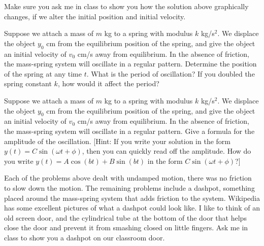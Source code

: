 Make sure you ask me in class to show you how the solution above graphically changes, if we alter the initial position and initial velocity.

\begin{problem}
 Suppose we attach a mass of $m$ kg to a spring with modulus $k$ kg/s$^2$. We displace the object $y_0$ cm from the equilibrium position of the spring, and give the object an initial velocity of $v_0$ cm/s away from equilibrium. In the absence of friction, the mass-spring system will oscillate in a regular pattern. Determine the position of the spring at any time $t$.  What is the period of oscillation? If you doubled the spring constant $k$, how would it affect the period?
\end{problem}

\begin{problem}
 Suppose we attach a mass of $m$ kg to a spring with modulus $k$ kg/s$^2$. We displace the object $y_0$ cm from the equilibrium position of the spring, and give the object an initial velocity of $v_0$ cm/s away from equilibrium. In the absence of friction, the mass-spring system will oscillate in a regular pattern. Give a formula for the amplitude of the oscillation. [Hint: If you write your solution in the form $y(t) = C\sin(\omega t+\phi)$, then you can quickly read off the amplitude. How do you write $y(t) = A\cos(bt)+B\sin(bt)$ in the form $C\sin(\omega t+\phi)$?] 
\end{problem}

Each of the problems above dealt with undamped motion, there was no friction to slow down the motion.  The remaining problems include a dashpot, something placed around the mass-spring system that adds friction to the system. Wikipedia has some excellent pictures of what a dashpot could look like.  I like to think of an old screen door, and the cylindrical tube at the bottom of the door that helps close the door and prevent it from smashing closed on little fingers.  Ask me in class to show you a dashpot on our classroom door.

